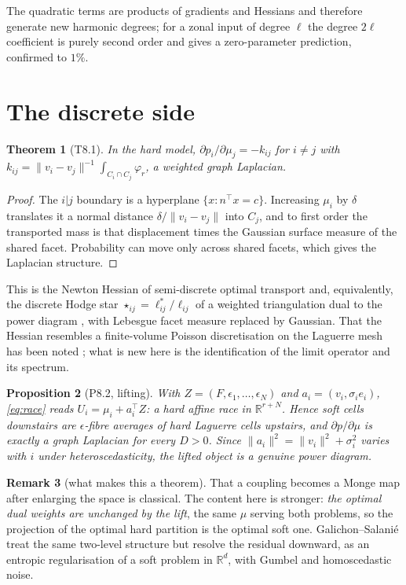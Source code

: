 \documentclass[11pt]{article}
\newtheorem{theorem}{Theorem}[section]
\newtheorem{proposition}[theorem]{Proposition}
\theoremstyle{definition}
\newtheorem{remark}[theorem]{Remark}
\newcommand{\R}{\mathbb{R}}
\begin{document}
The quadratic terms are products of gradients and Hessians and therefore
generate new harmonic degrees; for a zonal input of degree $\ell$ the degree
$2\ell$ coefficient is purely second order and gives a zero-parameter
prediction, confirmed to $1\%$.

\section{The discrete side}\label{sec:discrete}

\begin{theorem}[\textsf{T8.1}]\label{thm:facet}
In the hard model, $\partial p_{i}/\partial\mu_{j}=-k_{ij}$ for $i\ne j$ with
$k_{ij}=\lVert v_{i}-v_{j}\rVert^{-1}\int_{C_{i}\cap C_{j}}\varphi_{r}$, a
weighted graph Laplacian.
\end{theorem}
\begin{proof}
The $i|j$ boundary is a hyperplane $\{x:n^{\top}x=c\}$. Increasing $\mu_{i}$
by $\delta$ translates it a normal distance $\delta/\lVert v_i-v_j\rVert$ into
$C_{j}$, and to first order the transported mass is that displacement times
the Gaussian surface measure of the shared facet. Probability can move only
across shared facets, which gives the Laplacian structure.
\end{proof}

This is the Newton Hessian of semi-discrete optimal transport \cite{KMT} and,
equivalently, the discrete Hodge star $\star_{ij}=\ell^{*}_{ij}/\ell_{ij}$ of a
weighted triangulation dual to the power diagram \cite{deGoes}, with Lebesgue
facet measure replaced by Gaussian. That the Hessian resembles a finite-volume
Poisson discretisation on the Laguerre mesh has been noted \cite{Levy}; what is
new here is the identification of the limit operator and its spectrum.

\begin{proposition}[\textsf{P8.2}, lifting]\label{prop:lift}
With $Z=(F,\epsilon_{1},\dots,\epsilon_{N})$ and
$a_{i}=(v_{i},\sigma_{i}e_{i})$, \eqref{eq:race} reads
$U_{i}=\mu_{i}+a_{i}^{\top}Z$: a \emph{hard} affine race in $\R^{r+N}$. Hence
soft cells downstairs are $\epsilon$-fibre averages of hard Laguerre cells
upstairs, and $\partial p/\partial\mu$ is exactly a graph Laplacian for every
$D>0$. Since $\lVert a_{i}\rVert^{2}=\lVert v_{i}\rVert^{2}+\sigma_{i}^{2}$
varies with $i$ under heteroscedasticity, the lifted object is a genuine power
diagram.
\end{proposition}

\begin{remark}[what makes this a theorem]
That a coupling becomes a Monge map after enlarging the space is classical.
The content here is stronger: \emph{the optimal dual weights are unchanged by
the lift}, the same $\mu$ serving both problems, so the projection of the
optimal hard partition is the optimal soft one. Galichon--Salani\'e
\cite{GS} treat the same two-level structure but resolve the residual
downward, as an entropic regularisation of a soft problem in $\R^{d}$, with
Gumbel and homoscedastic noise.
\end{remark}
\end{document}
